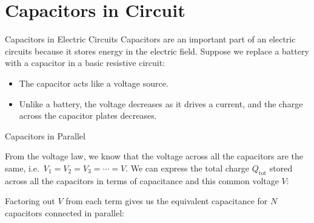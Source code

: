 \documentclass[12pt,aspectratio=169]{beamer}
\begin{document}
\section{Capacitors in Circuit}

\begin{frame}{Capacitors in Electric Circuits}
  Capacitors are an important part of an electric circuits because it stores
  energy in the electric field. Suppose we replace a battery with a capacitor
  in a basic resistive circuit:
  \begin{center}
  \end{center}
  \begin{itemize}
  \item The capacitor acts like a voltage source.
  \item Unlike a battery, the voltage decreases as it drives a current, and the
    charge across the capacitor plates decreases.
  \end{itemize}
\end{frame}



\begin{frame}{Capacitors in Parallel}
  \begin{center}
  \end{center}
  From the voltage law, we know that the voltage across all the capacitors are
  the same, i.e.\ $V_1=V_2=V_3=\cdots=V$. We can express the total charge
  $Q_\text{tot}$ stored across all the capacitors in terms of capacitance and
  this common voltage $V$: 

  
  Factoring out $V$ from each term gives us the equivalent capacitance for
  $N$ capacitors connected in parallel:

\end{frame}
\end{document}
